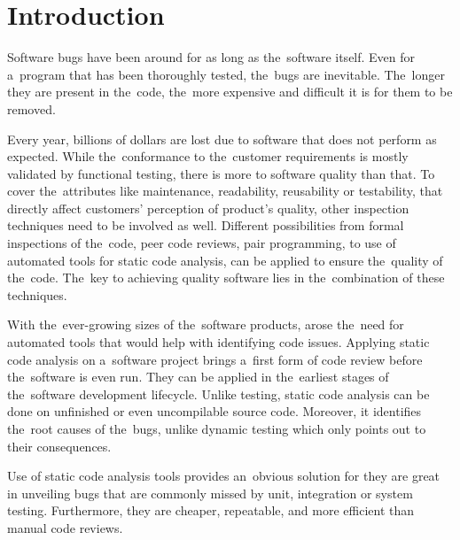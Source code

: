\documentclass[
  digital, %
  table,   %
  lof,     %
  lot,     %
  oneside,
]{fithesis3}
\begin{document}
\chapter{Introduction}

Software bugs have been around for as long as the~software itself. Even for a~program that has been thoroughly tested, the~bugs are inevitable. The~longer they are present in the~code, the~more expensive and difficult it is for them to be removed. 

Every year, billions of dollars are lost due to software that does not perform as expected. 
While the~conformance to the~customer requirements is mostly validated by functional testing, there is more to software quality than that. To cover the~attributes like maintenance, readability, reusability or testability, that directly affect customers' perception of product's quality, other inspection techniques need to be involved as well. Different possibilities from formal inspections of the~code, peer code reviews, pair programming, to use of automated tools for static code analysis, can be applied to ensure the~quality of the~code. The~key to achieving quality software lies in the~combination of these techniques. 

With the~ever-growing sizes of the~software products, arose the~need for automated tools that would help with identifying code issues. Applying static code analysis on a~software project brings a~first form of code review before the~software is even run. They can be applied in the~earliest stages of the~software development lifecycle. Unlike testing, static code analysis can be done on unfinished or even uncompilable source code. Moreover, it identifies the~root causes of the~bugs, unlike dynamic testing which only points out to their consequences. 

Use of static code analysis tools provides an~obvious solution for they are great in unveiling bugs that are commonly missed by unit, integration or system testing. Furthermore, they are cheaper, repeatable, and more efficient than manual code reviews. 
\end{document}
